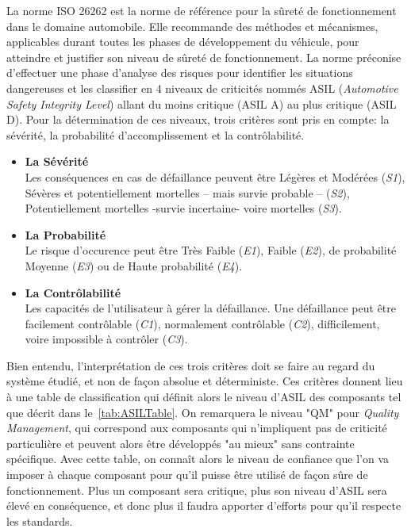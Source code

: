 \documentclass[french, a4paper, 11pt, twoside, pdftex]{StyleThese}
\begin{document}
		
		La norme ISO 26262 est la norme de référence pour la sûreté de fonctionnement dans le domaine automobile. Elle recommande des méthodes et mécanismes, applicables durant toutes les phases de développement du véhicule, pour atteindre et justifier son niveau de sûreté de fonctionnement. La norme préconise d’effectuer une phase d’analyse des risques pour identifier les situations dangereuses et les classifier en 4 niveaux de criticités nommés ASIL (\textit{Automotive Safety Integrity Level}) allant du moins critique (ASIL A) au plus critique (ASIL D). Pour la détermination de ces niveaux, trois critères sont pris en compte: la sévérité, la probabilité d'accomplissement et la contrôlabilité.
		
		\begin{itemize}
			\item 		\textbf{La Sévérité}	\\
			Les conséquences en cas de défaillance peuvent être Légères et Modérées (\emph{S1}), Sévères et potentiellement mortelles -- mais survie probable -- (\emph{S2}), Potentiellement mortelles -survie incertaine- voire mortelles (\emph{S3}). 		
			\item 		\textbf{La Probabilité} 	\\
			Le risque d'occurence peut être Très Faible (\emph{E1}), Faible (\emph{E2}), de probabilité Moyenne (\emph{E3}) ou de Haute probabilité (\emph{E4}).
			\item 		\textbf{La Contrôlabilité}	\\
			Les capacités de l'utilisateur à gérer la défaillance. Une défaillance peut être facilement contrôlable (\emph{C1}), normalement contrôlable (\emph{C2}), difficilement, voire impossible à contrôler (\emph{C3}).
		\end{itemize}
		
		Bien entendu, l'interprétation de ces trois critères doit se faire au regard du système étudié, et non de façon absolue et déterministe. 
		Ces critères donnent lieu à une table de classification qui définit alors le niveau d'ASIL des composants tel que décrit dans le~\autoref{tab:ASILTable}. On remarquera le niveau "QM" pour \textit{Quality Management}, qui correspond aux composants qui n'impliquent pas de criticité particulière et peuvent alors être développés "au mieux" sans contrainte spécifique. %
		Avec cette table, on connaît alors le niveau de confiance que l'on va imposer à chaque composant pour qu'il puisse être utilisé de façon sûre de fonctionnement. Plus un composant sera critique, plus son niveau d'ASIL sera élevé en conséquence, et donc plus il faudra apporter d'efforts pour qu'il respecte les standards.
\end{document}
